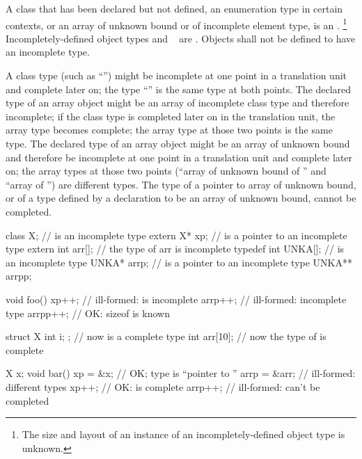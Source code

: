 \pnum
{}%
A class that has been declared but not defined, an enumeration type in certain
contexts, or an array of unknown
bound or of incomplete element type, is an
.%
\footnote{The size and layout of an instance of an incompletely-defined
object type is unknown.}
Incompletely-defined object types and \cv{}~ are
.
Objects shall not be defined to have an
incomplete type.

\pnum
A class type (such as ``'') might be incomplete at one
point in a translation unit and complete later on; the type
``'' is the same type at both points. The declared type
of an array object might be an array of incomplete class type and
therefore incomplete; if the class type is completed later on in the
translation unit, the array type becomes complete; the array type at
those two points is the same type. The declared type of an array object
might be an array of unknown bound and therefore be incomplete at one
point in a translation unit and complete later on; the array types at
those two points (``array of unknown bound of '' and ``array of
 '') are different types. The type of a pointer to array of
unknown bound, or of a type defined by a  declaration to
be an array of unknown bound, cannot be completed. \begin{example}

%
\begin{codeblock}
class X;                        //  is an incomplete type
extern X* xp;                   //  is a pointer to an incomplete type
extern int arr[];               // the type of arr is incomplete
typedef int UNKA[];             //  is an incomplete type
UNKA* arrp;                     //  is a pointer to an incomplete type
UNKA** arrpp;

void foo() {
  xp++;                         // ill-formed:  is incomplete
  arrp++;                       // ill-formed: incomplete type
  arrpp++;                      // OK: sizeof  is known
}

struct X { int i; };            // now  is a complete type
int  arr[10];                   // now the type of  is complete

X x;
void bar() {
  xp = &x;                      // OK; type is ``pointer to ''
  arrp = &arr;                  // ill-formed: different types
  xp++;                         // OK:   is complete
  arrp++;                       // ill-formed:  can't be completed
}
\end{codeblock}
\end{example}

